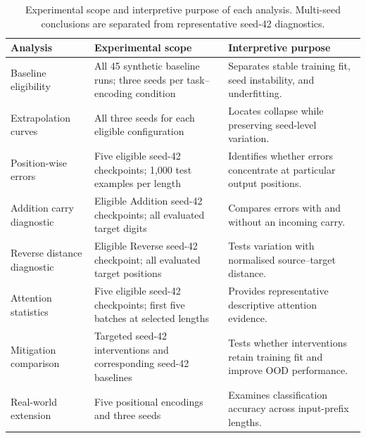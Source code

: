 \documentclass[
    author={Aanchala Ravindra Bhongade},
    supervisor={Dr. Fernando Moreno-Pino},
    degree={MSc},
    title={Length Generalisation in Transformer-Based Sequence Models: Failure Taxonomy and Mitigation Strategies},
    subtitle={},
    type={},
    year={2026}
]{dissertation}
\begin{document}
\begin{table}[htbp]
\centering
\scriptsize
\renewcommand{\arraystretch}{1.12}
\begin{tabular}{
    p{}
    p{}
    p{}
}
\hline
\textbf{Analysis} &
\textbf{Experimental scope} &
\textbf{Interpretive purpose} \\
\hline

Baseline eligibility &
All 45 synthetic baseline runs; three seeds per task--encoding condition &
Separates stable training fit, seed instability, and underfitting. \\

Extrapolation curves &
All three seeds for each eligible configuration &
Locates collapse while preserving seed-level variation. \\

Position-wise errors &
Five eligible seed-42 checkpoints; 1,000 test examples per length &
Identifies whether errors concentrate at particular output positions. \\

Addition carry diagnostic &
Eligible Addition seed-42 checkpoints; all evaluated target digits &
Compares errors with and without an incoming carry. \\

Reverse distance diagnostic &
Eligible Reverse seed-42 checkpoint; all evaluated target positions &
Tests variation with normalised source--target distance. \\

Attention statistics &
Five eligible seed-42 checkpoints; first five batches at selected lengths &
Provides representative descriptive attention evidence. \\

Mitigation comparison &
Targeted seed-42 interventions and corresponding seed-42 baselines &
Tests whether interventions retain training fit and improve OOD performance. \\

Real-world extension &
Five positional encodings and three seeds &
Examines classification accuracy across input-prefix lengths. \\
\hline
\end{tabular}
\caption{Experimental scope and interpretive purpose of each analysis.
Multi-seed conclusions are separated from representative seed-42
diagnostics.}
\label{tab:appendix-diagnostic-scope}
\end{table}
\end{document}
